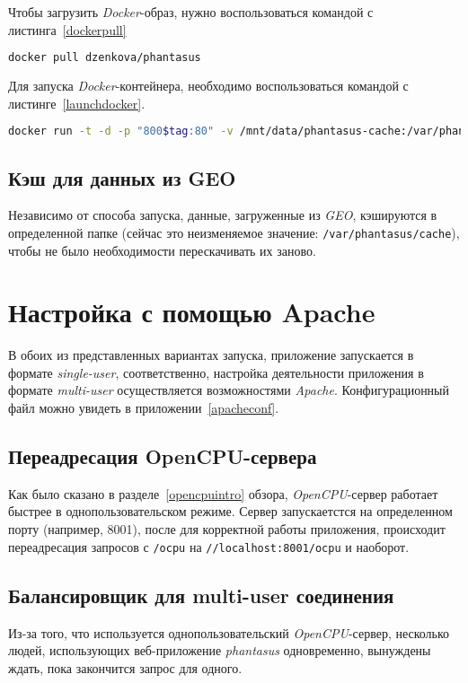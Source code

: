 Чтобы загрузить \emph{Docker}-образ, нужно воспользоваться командой с листинга~\ref{dockerpull}
\begin{lstlisting}[float=!h,language=bash,label={dockerpull},caption={Загрузка Docker-образа phantasus}]
  docker pull dzenkova/phantasus
\end{lstlisting}

Для запуска \emph{Docker}-контейнера, необходимо воспользоваться командой с листинге~\ref{launchdocker}.
\begin{lstlisting}[float=!h,language=bash,label={launchdocker},caption={Запуск Docker-контейнера}]
  docker run -t -d -p "800$tag:80" -v /mnt/data/phantasus-cache:/var/phantasus/cache dzenkova/phantasus
\end{lstlisting}

\subsection{Кэш для данных из GEO}
Независимо от способа запуска, данные, загруженные из \emph{GEO}, кэшируются в определенной папке (сейчас это неизменяемое значение: \texttt{/var/phantasus/cache}), чтобы не было необходимости перескачивать их заново.

\section{Настройка с помощью Apache}
В обоих из представленных вариантах запуска, приложение запускается в формате \emph{single-user}, соответственно, настройка деятельности приложения в формате \emph{multi-user} осуществляется возможностями \emph{Apache}. Конфигурационный файл можно увидеть в приложении~\ref{apacheconf}.

\subsection{Переадресация OpenCPU-сервера}
Как было сказано в разделе~\ref{opencpuintro} обзора, \emph{OpenCPU}-сервер работает быстрее в однопользовательском режиме. Сервер запускаетстся на определенном порту (например, 8001), после для корректной работы приложения, происходит переадресация запросов с \texttt{/ocpu} на \texttt{//localhost:8001/ocpu} и наоборот.

\subsection{Балансировщик для multi-user соединения}
Из-за того, что используется однопользовательский \emph{OpenCPU}-сервер, несколько людей, использующих веб-приложение \emph{phantasus} одновременно, вынуждены ждать, пока закончится запрос для одного.

